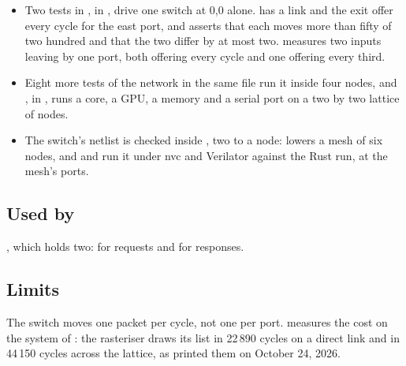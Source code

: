\begin{itemize}
\item Two tests in , in
, drive one switch at 0,0 alone.
\allowbreak{} has a link and the exit
offer every cycle for the east port, and asserts that each moves more
than fifty of two hundred and that the two differ by at most two.
\allowbreak{}
measures two inputs leaving by one port, both offering every cycle and
one offering every third.
\item Eight more tests of the network in the same file run it inside
four nodes, and ,
in , runs a core, a GPU, a memory and a serial
port on a two by two lattice of nodes.
\item The switch's netlist is checked inside , two to a
node:  lowers a mesh of six nodes, and
 and 
run it under nvc and Verilator against the Rust run, at the mesh's
ports.
\end{itemize}

\subsection*{Used by}

, which holds two:  for requests and 
for responses.

\subsection*{Limits}

The switch moves one packet per cycle, not one per port.
 measures the cost on the system of : the
rasteriser draws its list in 22\,890 cycles on a direct link and in
44\,150 cycles across the lattice, as  printed them on
October 24, 2026.
